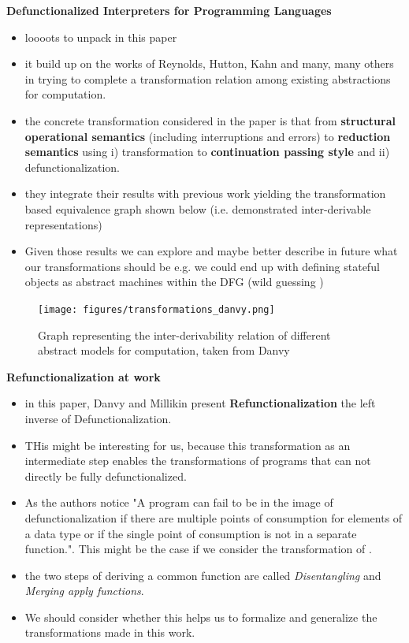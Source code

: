 \textbf{Defunctionalized Interpreters for Programming Languages}~\cite{danvy2008defunctionalized}
\begin{itemize}
    \item loooots to unpack in this paper
    \item it build up on the works of Reynolds, Hutton, Kahn and many, many others in trying to complete a transformation relation among existing abstractions for computation. 
    \item the concrete transformation considered in the paper is that from \textbf{structural operational semantics} (including interruptions and errors) to \textbf{reduction semantics} using i) transformation to \textbf{continuation passing style} and ii) defunctionalization. 
    \item they integrate their results with previous work yielding the transformation based equivalence graph shown below (i.e. demonstrated inter-derivable representations)
    \item Given those results we can explore and maybe better describe in future what our transformations should be e.g. we could end up with defining stateful objects as abstract machines within the DFG (wild guessing )
\end{itemize}

\begin{figure}[H]
   \texttt{[image: figures/transformations\_danvy.png]}
\caption{Graph representing the inter-derivability relation of different abstract models for computation, taken from Danvy~\cite{danvy2008defunctionalized}}
\label{fig:transformationsDanvy}
\end{figure}

\textbf{Refunctionalization at work}\cite{DANVY2009534}
\begin{itemize}
    \item in this paper, Danvy and Millikin present \textbf{Refunctionalization} the left inverse of Defunctionalization. 
    \item THis might be interesting for us, because this transformation as an intermediate step enables the transformations of programs that can not directly be fully defunctionalized. 
    \item As the authors notice "A program can fail to be in the image of defunctionalization if there are multiple points of consumption for elements of a data type or if the single point of consumption is not in a separate function.". This might be the case if we consider the transformation of . 
    \item the two steps of deriving a common  function are called \emph{Disentangling} and \emph{Merging apply functions}.
    \item We should consider whether this helps us to formalize and generalize the transformations made in this work.
\end{itemize}

